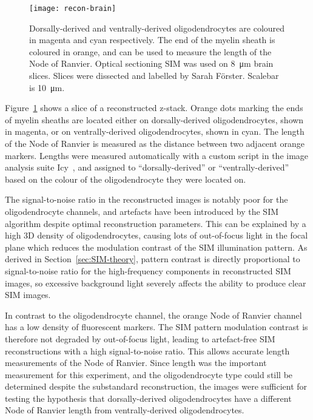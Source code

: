 \begin{figure}[tbp!]
\centering
\texttt{[image: recon-brain]}
\caption[LAG SIM: Multicolour optical sectioning SIM to measure the Node of Ranvier on ventrally- and dorsally-derived oligodendrocytes]{Dorsally-derived and ventrally-derived oligodendrocytes are coloured in magenta and cyan respectively. The end of the myelin sheath is coloured in orange, and can be used to measure the length of the Node of Ranvier. Optical sectioning SIM was used on \SI{8}{\micro\metre} brain slices. Slices were dissected and labelled by Sarah F{\"o}rster. Scalebar is \SI{10}{\micro\metre}. }
\label{fig:recon-brain}
\end{figure}
\afterpage{\clearpage}

Figure~\ref{fig:recon-brain} shows a slice of a reconstructed z-stack.
Orange dots marking the ends of myelin sheaths are located either on dorsally-derived oligodendrocytes, shown in magenta, or on ventrally-derived oligodendrocytes, shown in cyan.
The length of the Node of Ranvier is measured as the distance between two adjacent orange markers.
Lengths were measured automatically with a custom script in the image analysis suite Icy~\cite{de2012icy}, and assigned to ``dorsally-derived'' or ``ventrally-derived'' based on the colour of the oligodendrocyte they were located on.

The signal-to-noise ratio in the reconstructed images is notably poor for the oligodendrocyte channels, and artefacts have been introduced by the SIM algorithm despite optimal reconstruction parameters.
This can be explained by a high 3D density of oligodendrocytes, causing lots of out-of-focus light in the focal plane which reduces the modulation contrast of the SIM illumination pattern.
As derived in Section~\ref{sec:SIM-theory}, pattern contrast is directly proportional to signal-to-noise ratio for the high-frequency components in reconstructed SIM images, so excessive background light severely affects the ability to produce clear SIM images.

In contrast to the oligodendrocyte channel, the orange Node of Ranvier channel has a low density of fluorescent markers.
The SIM pattern modulation contrast is therefore not degraded by out-of-focus light, leading to artefact-free SIM reconstructions with a high signal-to-noise ratio.
This allows accurate length measurements of the Node of Ranvier.
Since length was the important measurement for this experiment, and the oligodendrocyte type could still be determined despite the substandard reconstruction, the images were sufficient for testing the hypothesis that dorsally-derived oligodendrocytes have a different Node of Ranvier length from ventrally-derived oligodendrocytes.

